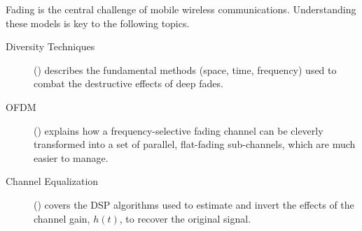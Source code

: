 \begin{importantbox}[title={Further Reading}]
    Fading is the central challenge of mobile wireless communications. Understanding these models is key to the following topics.
    \begin{description}
        \item[Diversity Techniques] () describes the fundamental methods (space, time, frequency) used to combat the destructive effects of deep fades.
        \item[OFDM] () explains how a frequency-selective fading channel can be cleverly transformed into a set of parallel, flat-fading sub-channels, which are much easier to manage.
        \item[Channel Equalization] () covers the DSP algorithms used to estimate and invert the effects of the channel gain, $h(t)$, to recover the original signal.
    \end{description}
\end{importantbox}
